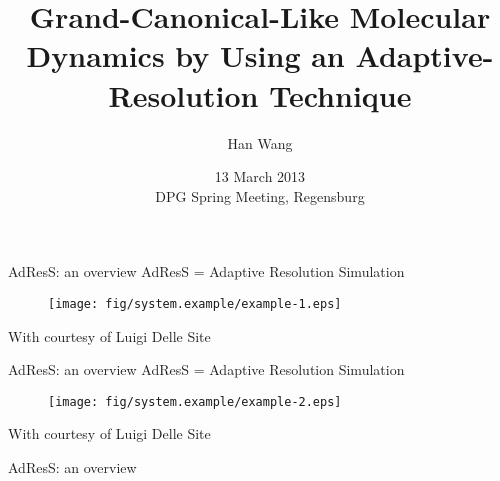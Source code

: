 \documentclass{beamer}
\newcommand{\redc}[1]{{\color{red} #1}}
\newcommand{\whitec}[1]{{\color{white} #1}}
\newcommand{\vect}[1]{\textbf{\textit{#1}}}
\newcommand{\AT}{{\textrm{{AT}}}}
\newcommand{\CG}{{\textrm{CG}}}
\newcommand{\thf}{{\textrm{th}}}
\newcommand{\rdf}{{\textrm{rdf}}}
\begin{document}
\title[]{
  Grand-Canonical-Like Molecular Dynamics  by Using an
  Adaptive-Resolution Technique
}
%
\author{Han Wang}
\date[2013]{13 March 2013\\ DPG Spring Meeting, Regensburg}
\frame{\titlepage}

\begin{frame}{AdResS: an overview}
  \redc{AdResS} = \redc{Ad}aptive \redc{Res}olution \redc{S}imulation
  \begin{figure}
    \centering 
    \texttt{[image: fig/system.example/example-1.eps]}
  \end{figure}
  \footnotesize{With courtesy of Luigi Delle Site}
\end{frame}

\begin{frame}{AdResS: an overview}
  \redc{AdResS} = \redc{Ad}aptive \redc{Res}olution \redc{S}imulation
  \begin{figure}
    \centering 
    \texttt{[image: fig/system.example/example-2.eps]}
  \end{figure}  
  \footnotesize{With courtesy of Luigi Delle Site}
\end{frame}


\begin{frame}{AdResS: an overview}
\end{frame}
\end{document}
